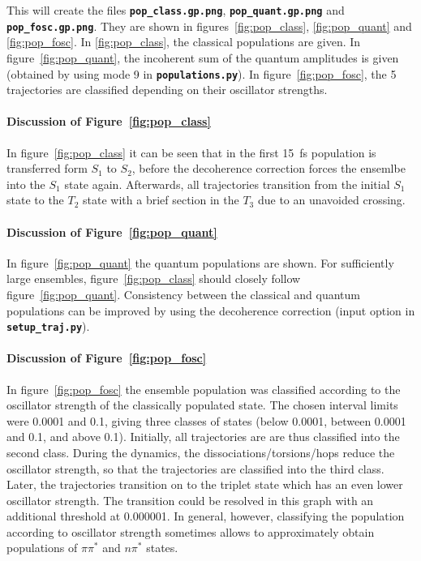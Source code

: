 \documentclass[a4paper,11pt,DIV=15,openany]{scrbook}
\newcommand{\ttt}[1]{\textbf{\texttt{#1}}}
\begin{document}
This will create the files \ttt{pop\_class.gp.png}, \ttt{pop\_quant.gp.png} and \ttt{pop\_fosc.gp.png}. They are shown in figures~\ref{fig:pop_class}, \ref{fig:pop_quant} and \ref{fig:pop_fosc}. 
In \ref{fig:pop_class}, the classical populations are given. 
In figure~\ref{fig:pop_quant}, the incoherent sum of the quantum amplitudes is given (obtained by using mode 9 in \ttt{populations.py}).
In figure~\ref{fig:pop_fosc}, the 5 trajectories are classified depending on their oscillator strengths.



\paragraph{Discussion of Figure~\ref{fig:pop_class}}

In figure~\ref{fig:pop_class} it can be seen that in the first 15~fs population is transferred form $S_1$ to $S_2$, before the decoherence correction forces the ensemlbe into the $S_1$ state again. Afterwards, all trajectories transition from the initial $S_1$ state to the $T_2$ state with a brief section in the $T_3$ due to an unavoided crossing.

\paragraph{Discussion of Figure~\ref{fig:pop_quant}}

In figure~\ref{fig:pop_quant} the quantum populations are shown. For sufficiently large ensembles, figure~\ref{fig:pop_class} should closely follow figure~\ref{fig:pop_quant}. Consistency between the classical and quantum populations can be improved by using the decoherence correction (input option in \ttt{setup\_traj.py}).

\paragraph{Discussion of Figure~\ref{fig:pop_fosc}}

In figure~\ref{fig:pop_fosc} the ensemble population was classified according to the oscillator strength of the classically populated state. 
The chosen interval limits were 0.0001 and 0.1, giving three classes of states (below 0.0001, between 0.0001 and 0.1, and above 0.1). 
Initially, all trajectories are are thus classified into the second class. 
During the dynamics, the dissociations/torsions/hops reduce the oscillator strength, so that the trajectories are classified into the third class.
Later, the trajectories transition on to the triplet state which has an even lower oscillator strength. The transition could be resolved in this graph with an additional threshold at 0.000001.  
In general, however, classifying the population according to oscillator strength sometimes allows to approximately obtain populations of $\pi\pi^*$ and $n\pi^*$ states.
\end{document}
